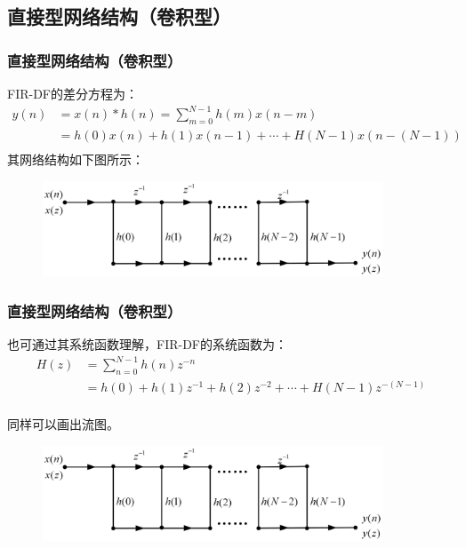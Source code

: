 \documentclass[notheorems,compress,mathserif,table]{beamer}
\begin{document}
\subsection{直接型网络结构（卷积型）}
\begin{frame}\frametitle{直接型网络结构（卷积型）}%

FIR-DF的差分方程为：
\begin{equation*}
\begin{split}
y(n)  &=x(n)*h(n)=\sum_{m=0}^{N-1}h(m)x(n-m)\\
     &= h(0)x(n) + h(1)x(n-1) +\cdots + H(N-1)x(n-(N-1))\\
\end{split}
\end{equation*}
其网络结构如下图所示：
\begin{figure}[h]
\centering
\includegraphics[width=0.9\textwidth]{firzhijie.jpg}
\end{figure}
\end{frame}
\begin{frame}\frametitle{直接型网络结构（卷积型）}%
\par 也可通过其系统函数理解，FIR-DF的系统函数为：
\begin{equation*}
\begin{split}
H(z) &=\sum_{n=0}^{N-1}h(n)z^{-n}\\
     &= h(0) + h(1)z^{-1} + h(2)z^{-2} +\cdots + H(N-1)z^{-(N-1)}\\
\end{split}
\end{equation*}
\par 同样可以画出流图。
\begin{figure}[h]
\centering
\includegraphics[width=0.9\textwidth]{firzhijie.jpg}
\end{figure}
\end{frame}
\end{document}
